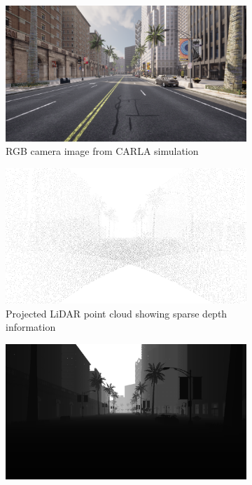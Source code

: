 \begin{figure}[h]
    \centering
    \begin{subfigure}{\textwidth}
        \centering
        \includegraphics[width=\textwidth, trim=0 200pt 0 200pt, clip]{figures/rgb.png}
        \caption{RGB camera image from CARLA simulation}
        \label{fig:rgb_input}
    \end{subfigure}
    \begin{subfigure}{\textwidth}
        \centering
        \includegraphics[width=\textwidth, trim=0 200pt 0 200pt, clip]{figures/point_cloud.png}
        \caption{Projected \ac{LiDAR} point cloud showing sparse depth information}
        \label{fig:pointcloud_input}
    \end{subfigure}
    \begin{subfigure}{\textwidth}
        \centering
        \includegraphics[width=\textwidth, trim=0 200pt 0 200pt, clip]{figures/depth_gt.png}

\end{subfigure}
\end{figure}
